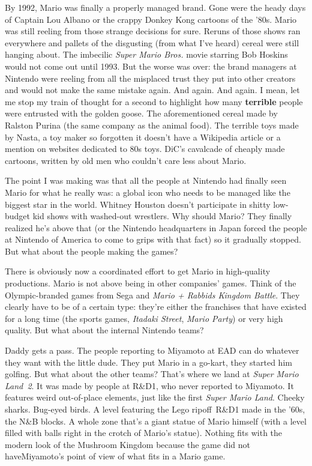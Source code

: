 \documentclass{book}
\begin{document}
By 1992, Mario was finally a properly managed brand. Gone were the heady days of Captain Lou Albano or the crappy Donkey Kong cartoons of the ’80s. Mario was still reeling from those strange decisions for sure. Reruns of those shows ran everywhere and pallets of the disgusting (from what I’ve heard) cereal were still hanging about. The imbecilic \emph{Super Mario Bros.} movie starring Bob Hoskins would not come out until 1993. But the worse was over: the brand managers at Nintendo were reeling from all the misplaced trust they put into other creators and would not make the same mistake again. And again. And again. I mean, let me stop my train of thought for a second to highlight how many \textbf{terrible} people were entrusted with the golden goose. The aforementioned cereal made by Ralston Purina (the same company as the animal food). The terrible toys made by Nasta, a toy maker so forgotten it doesn’t have a Wikipedia article or a mention on websites dedicated to 80s toys. DiC’s cavalcade of cheaply made cartoons, written by old men who couldn’t care less about Mario.

The point I was making was that all the people at Nintendo had finally seen Mario for what he really was: a global icon who needs to be managed like the biggest star in the world. Whitney Houston doesn’t participate in shitty low-budget kid shows with washed-out wrestlers. Why should Mario? They finally realized he’s above that (or the Nintendo headquarters in Japan forced the people at Nintendo of America to come to grips with that fact) so it gradually stopped. But what about the people making the games?

There is obviously now a coordinated effort to get Mario in high-quality productions. Mario is not above being in other companies’ games. Think of the Olympic-branded games from Sega and \emph{Mario + Rabbids Kingdom Battle}. They clearly have to be of a certain type: they’re either the franchises that have existed for a long time (the sports games, \emph{Itadaki Street}, \emph{Mario Party}) or very high quality. But what about the internal Nintendo teams?

Daddy gets a pass. The people reporting to Miyamoto at EAD can do whatever they want with the little dude. They put Mario in a go-kart, they started him golfing. But what about the other teams? That’s where we land at \emph{Super Mario Land 2}. It was made by people at R\&D1, who never reported to Miyamoto. It features weird out-of-place elements, just like the first \emph{Super Mario Land}. Cheeky sharks. Bug-eyed birds. A level featuring the Lego ripoff R\&D1 made in the ’60s, the N\&B blocks. A whole zone that’s a giant statue of Mario himself (with a level filled with balls right in the crotch of Mario’s statue). Nothing fits with the modern look of the Mushroom Kingdom because the game did not haveMiyamoto’s point of view of what fits in a Mario game.
\end{document}
